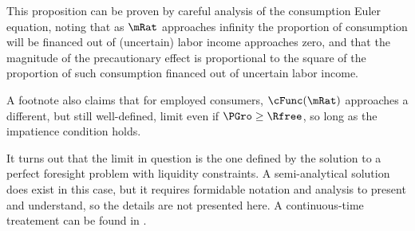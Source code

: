 \documentclass{\handout}
\begin{document}
This proposition can be proven by careful analysis of the consumption Euler equation,
noting that as $\mRat$ approaches infinity the proportion of consumption will
be financed out of (uncertain) labor income approaches zero, and that the magnitude
of the precautionary effect is proportional to the square of the proportion of such
consumption financed out of uncertain labor income.

A footnote also claims that for employed consumers, $\cFunc(\mRat)$
approaches a different, but still well-defined, limit even if $\PGro
\geq \Rfree$, so long as the impatience condition holds.

It turns out that the limit in question is the one defined by the solution to a
perfect foresight problem with liquidity constraints.  A semi-analytical solution does
exist in this case, but it requires formidable notation and analysis to present and
understand, so the details are not presented here.  A continuous-time treatement
can be found in \cite{parkLiqConstrContinuous}.

\pagebreak

\end{document}
